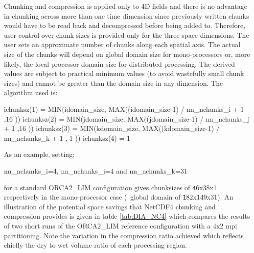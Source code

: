 \documentclass[../main/NEMO_manual]{subfiles}
\begin{document}
Chunking and compression is applied only to 4D fields and there is no advantage in
chunking across more than one time dimension since previously written chunks would have to
be read back and decompressed before being added to.  Therefore, user control over chunk
sizes is provided only for the three space dimensions.  The user sets an approximate
number of chunks along each spatial axis.  The actual size of the chunks will depend on
global domain size for mono-processors or, more likely, the local processor domain size
for distributed processing.  The derived values are subject to practical minimum values
(to avoid wastefully small chunk sizes) and cannot be greater than the domain size in any
dimension.  The algorithm used is:

\begin{forlines}
ichunksz(1) = MIN(idomain_size, MAX((idomain_size-1) / nn_nchunks_i + 1 ,16 ))
ichunksz(2) = MIN(jdomain_size, MAX((jdomain_size-1) / nn_nchunks_j + 1 ,16 ))
ichunksz(3) = MIN(kdomain_size, MAX((kdomain_size-1) / nn_nchunks_k + 1 , 1 ))
ichunksz(4) = 1
\end{forlines}

\noindent As an example, setting:

\begin{forlines}
nn_nchunks_i=4, nn_nchunks_j=4 and nn_nchunks_k=31
\end{forlines}

\noindent for a standard ORCA2\_LIM configuration gives chunksizes of {\small\texttt 46x38x1} respectively in
the mono-processor case (\ie\ global domain of {\small\texttt 182x149x31}).
An illustration of the potential space savings that NetCDF4 chunking and compression provides is given in
table \autoref{tab:DIA_NC4} which compares the results of two short runs of the ORCA2\_LIM reference configuration with
a 4x2 mpi partitioning.
Note the variation in the compression ratio achieved which reflects chiefly the dry to wet volume ratio of
each processing region.
\end{document}
